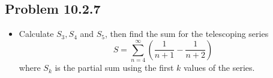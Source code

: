 \begin{itemize}
  \newpage
  \subsection{Problem 10.2.7}
  \begin{itemize}
    \item Calculate \(S_3, S_4\) and \(S_5\), then find the sum for the
      telescoping series
      \[%
        S = \sum_{n=4}^{\infty} \left( \frac{1}{n+1} - \frac{1}{n+2} \right)
      \]%
      where \(S_k\) is the partial sum using the first \(k\) values of the
      series.
  \end{itemize}

\end{itemize}

